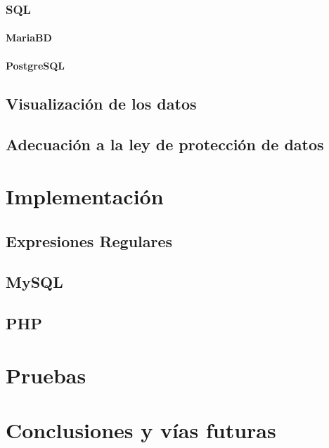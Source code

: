 \documentclass[a4paper,openright,11pt,spanish]{book}
\begin{document}
\subsection{SQL}
\subsubsection{MariaBD}
\subsubsection{PostgreSQL}
\section{Visualización de los datos}
\section{Adecuación a la ley de protección de datos}
\chapter{Implementación}
\section{Expresiones Regulares}
\section{MySQL}
\section{PHP}
\chapter{Pruebas}
\chapter{Conclusiones y vías futuras}

%
%
%
%
%
%
%
%
%
%
%
%
%
%
%
%
%
%

%
%
%
%
\chapter*{}
\thispagestyle{empty}
\end{document}
